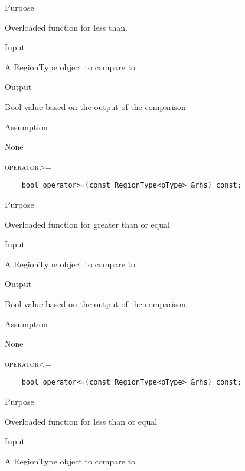 \documentclass[pdftex, 11pt]{article}
\begin{document}
\begin{description}
\begin{description}
			\item{Purpose}

				Overloaded function for less than.

			\item{Input}

				A RegionType object to compare to

			\item{Output}

				Bool value based on the output of the comparison

			\item{Assumption}

				None

		\end{description}

	\item{\textsc{operator>=}}
		\begin{description}
\begin{lstlisting}
	bool operator>=(const RegionType<pType> &rhs) const;
\end{lstlisting}

			\item{Purpose}

				Overloaded function for greater than or equal

			\item{Input}

				A RegionType object to compare to

			\item{Output}

				Bool value based on the output of the comparison

			\item{Assumption}

				None

		\end{description}

	\item{\textsc{operator<=}}
		\begin{description}
\begin{lstlisting}
	bool operator<=(const RegionType<pType> &rhs) const;
\end{lstlisting}

			\item{Purpose}

				Overloaded function for less than or equal

			\item{Input}

				A RegionType object to compare to


\end{description}
\end{description}
\end{document}
